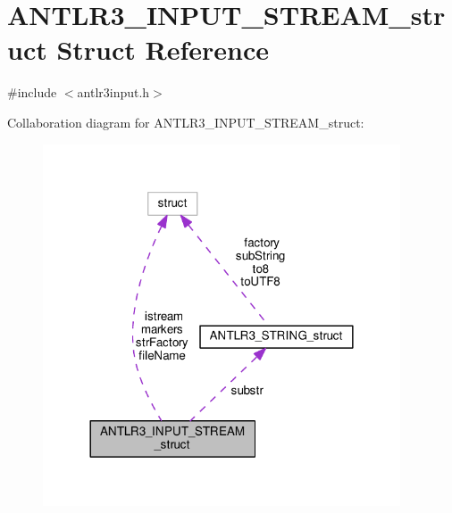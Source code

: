 \hypertarget{struct_a_n_t_l_r3___i_n_p_u_t___s_t_r_e_a_m__struct}{\section{A\-N\-T\-L\-R3\-\_\-\-I\-N\-P\-U\-T\-\_\-\-S\-T\-R\-E\-A\-M\-\_\-struct Struct Reference}
\label{struct_a_n_t_l_r3___i_n_p_u_t___s_t_r_e_a_m__struct}
}


{\ttfamily \#include $<$antlr3input.\-h$>$}



Collaboration diagram for A\-N\-T\-L\-R3\-\_\-\-I\-N\-P\-U\-T\-\_\-\-S\-T\-R\-E\-A\-M\-\_\-struct\-:
\nopagebreak
\begin{figure}[H]
\begin{center}
\leavevmode
\includegraphics[width=300pt]{struct_a_n_t_l_r3___i_n_p_u_t___s_t_r_e_a_m__struct__coll__graph}
\end{center}
\end{figure}
